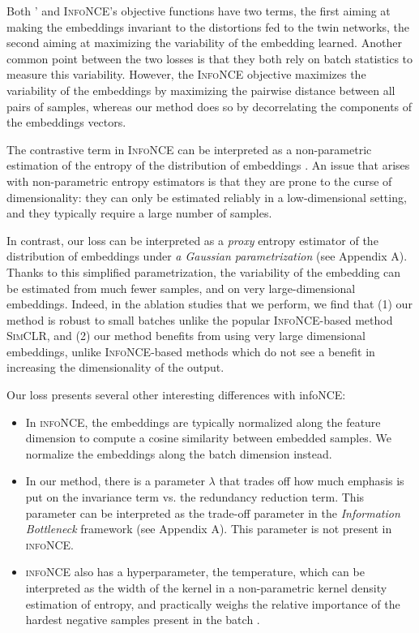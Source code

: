 Both \AlgoName{}' and \textsc{InfoNCE}'s objective functions have two terms, the first aiming at making the embeddings invariant to the distortions fed to the twin networks, the second aiming at maximizing the variability of the embedding learned.  Another common point between the two losses is that they both rely on batch statistics to measure this variability. However, the \textsc{InfoNCE} objective maximizes the variability of the embeddings by maximizing the pairwise distance between all pairs of samples, whereas our method does so by decorrelating the components of the embeddings vectors. 

The contrastive term in \textsc{InfoNCE} can be interpreted as a non-parametric estimation of the entropy of the distribution of embeddings \cite{wang_understanding_2020}. An issue that arises with non-parametric entropy estimators is that they are prone to the curse of dimensionality: they can only be estimated reliably in a low-dimensional setting, and they typically require a large number of samples. 

In contrast, our loss can be interpreted as a \emph{proxy} entropy estimator of the distribution of embeddings under \emph{a Gaussian parametrization} (see Appendix A). Thanks to this simplified parametrization, the variability of the embedding can be estimated from much fewer samples, and on very large-dimensional embeddings. Indeed, in the ablation studies that we perform, we find that (1) our method is robust to small batches unlike the popular \textsc{InfoNCE}-based method \textsc{SimCLR}, and (2) our method benefits from using very large dimensional embeddings, unlike \textsc{InfoNCE}-based methods which do not see a benefit in increasing the dimensionality of the output.

Our loss presents several other interesting differences with infoNCE:
\begin{itemize}
\item In \textsc{infoNCE}, the embeddings are typically normalized along the feature dimension to compute a cosine similarity between embedded samples. We normalize the embeddings along the batch dimension instead.

\item In our method, there is a parameter $\lambda$ that trades off how much emphasis is put on the invariance term vs. the redundancy reduction term. This parameter can be interpreted as the trade-off parameter in the \emph{Information Bottleneck} framework (see Appendix A). This parameter is not present in \textsc{infoNCE}. 

\item \textsc{infoNCE} also has a hyperparameter, the temperature, which can be interpreted as the width of the kernel in a non-parametric kernel density estimation of entropy, and practically weighs the relative importance of the hardest negative samples present in the batch \cite{chen2020simple}.
\end{itemize}


